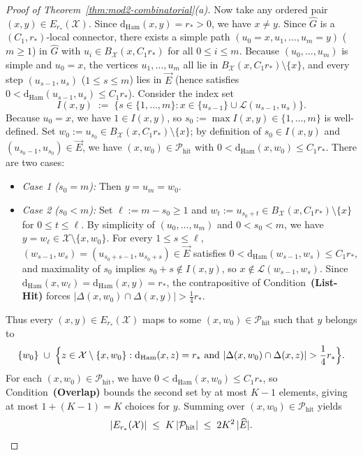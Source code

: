\documentclass[11pt]{article}
\theoremstyle{definition}
\theoremstyle{remark}
\newcommand{\Ham}{\mathrm{Ham}}
\newcommand{\dHam}{\mathrm{d}_{\Ham}}
\begin{document}
\begin{proof}[Proof of Theorem~\ref{thm:mod2-combinatorial}(a)]
Now take any ordered pair $(x, y) \in E_{r_*}(\mathcal{X})$. Since $\dHam(x, y) = r_* > 0$, we have $x \ne y$. Since $\widehat{G}$ is a $(C_1, r_*)$-local connector, there exists a simple path $(u_0 = x, u_1, \dots, u_m = y)$ ($m \ge 1$) in $\widehat{G}$ with $u_i \in B_{\mathcal{X}}(x, C_1 r_*)$ for all $0 \le i \le m$. Because $(u_0, \dots, u_m)$ is simple and $u_0 = x$, the vertices $u_1, \dots, u_m$ all lie in $B_{\mathcal{X}}(x, C_1 r_*) \setminus \{x\}$, and every step $(u_{s-1}, u_s)$ ($1 \le s \le m$) lies in $\vec{E}$ (hence satisfies $0 < \dHam(u_{s-1}, u_s) \le C_1 r_*$). Consider the index set
\[
I(x, y) \;:=\; \bigl\{s \in \{1, \dots, m\} : x \in \{u_{s-1}\} \cup \mathcal{L}(u_{s-1}, u_s)\bigr\}.
\]
Because $u_0 = x$, we have $1 \in I(x, y)$, so $s_0 := \max I(x, y) \in \{1, \dots, m\}$ is well-defined. Set $w_0 := u_{s_0} \in B_{\mathcal{X}}(x, C_1 r_*) \setminus \{x\}$; by definition of $s_0 \in I(x, y)$ and $(u_{s_0-1}, u_{s_0}) \in \vec{E}$, we have $(x, w_0) \in \mathcal{P}_{\mathrm{hit}}$ with $0 < \dHam(x, w_0) \le C_1 r_*$. There are two cases:
\begin{itemize}[leftmargin=2em,nosep]
  \item \emph{Case 1 ($s_0 = m$):} Then $y = u_m = w_0$.
  \item \emph{Case 2 ($s_0 < m$):} Set $\ell := m - s_0 \ge 1$ and $w_t := u_{s_0 + t} \in B_{\mathcal{X}}(x, C_1 r_*) \setminus \{x\}$ for $0 \le t \le \ell$. By simplicity of $(u_0, \dots, u_m)$ and $0 < s_0 < m$, we have $y = w_\ell \in \mathcal{X} \setminus \{x, w_0\}$. For every $1 \le s \le \ell$, $(w_{s-1}, w_s) = (u_{s_0+s-1}, u_{s_0+s}) \in \vec{E}$ satisfies $0 < \dHam(w_{s-1}, w_s) \le C_1 r_*$, and maximality of $s_0$ implies $s_0 + s \notin I(x, y)$, so $x \notin \mathcal{L}(w_{s-1}, w_s)$. Since $\dHam(x, w_\ell) = \dHam(x, y) = r_*$, the contrapositive of Condition~\textbf{(List-Hit)} forces $|\Delta(x, w_0) \cap \Delta(x, y)| > \frac{1}{4} r_*$.
\end{itemize}
Thus every $(x, y) \in E_{r_*}(\mathcal{X})$ maps to some $(x, w_0) \in \mathcal{P}_{\mathrm{hit}}$ such that $y$ belongs to
\[
\{w_0\} \;\cup\; \Bigl\{z \in \mathcal{X} \setminus \{x, w_0\} : \dHam(x, z) = r_* \text{ and } |\Delta(x, w_0) \cap \Delta(x, z)| > \frac{1}{4} r_*\Bigr\}.
\]
For each $(x, w_0) \in \mathcal{P}_{\mathrm{hit}}$, we have $0 < \dHam(x, w_0) \le C_1 r_*$, so Condition~\textbf{(Overlap)} bounds the second set by at most $K - 1$ elements, giving at most $1 + (K - 1) = K$ choices for $y$. Summing over $(x, w_0) \in \mathcal{P}_{\mathrm{hit}}$ yields
\[
|E_{r_*}(\mathcal{X})| \;\le\; K\,|\mathcal{P}_{\mathrm{hit}}| \;\le\; 2 K^2\,|\widehat{E}|. \qedhere
\]
\end{proof}
\end{document}
